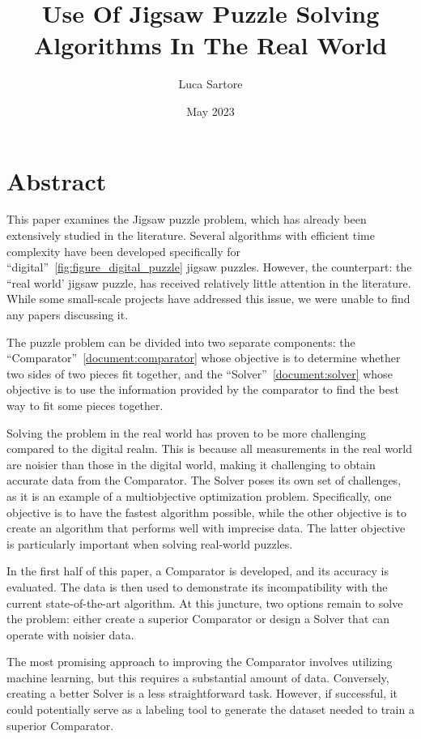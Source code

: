 \documentclass{article}
\title{Use Of Jigsaw Puzzle Solving Algorithms In The Real World}
\author{Luca Sartore}
\date{May 2023}
\begin{document}
\maketitle

\newpage

{
  \hypersetup{linkcolor=black}
  \tableofcontents
}

\newpage

\section{Abstract}
This paper examines the Jigsaw puzzle problem,
which has already been extensively studied in the literature.
Several algorithms with efficient time complexity have been developed
specifically for ``digital''~\ref{fig:figure_digital_puzzle} jigsaw puzzles. However, the counterpart:
the ``real world' jigsaw puzzle, has received relatively little attention
in the literature. While some small-scale projects have addressed this issue,
we were unable to find any papers discussing it.

The puzzle problem can be divided into two separate components: the ``Comparator''~\ref{document:comparator}
whose objective is to determine whether two sides of two pieces fit together,
and the ``Solver''~\ref{document:solver} whose objective is to use the information provided
by the comparator to find the best way to fit some pieces together.

Solving the problem in the real world has proven to be more challenging compared
to the digital realm.
This is because all measurements in the real world are noisier than those
in the digital world, making it challenging to obtain accurate data from the Comparator.
The Solver poses its own set of challenges, as it is an example of a
multiobjective optimization problem. Specifically, one objective is to have
the fastest algorithm possible,
while the other objective is to create an algorithm that performs well with
imprecise data. The latter objective is particularly important when solving
real-world puzzles.

In the first half of this paper, a Comparator is developed, and its accuracy
is evaluated.
The data is then used to demonstrate its incompatibility with the current
state-of-the-art algorithm. At this juncture,
two options remain to solve the problem:
either create a superior Comparator or design a
Solver that can operate with noisier data.

The most promising approach to improving the Comparator
involves utilizing machine learning, but this requires a substantial amount of data.
Conversely, creating a better Solver is a less straightforward task.
However, if successful, it could potentially serve as a labeling tool
to generate the dataset needed to train a superior Comparator.
\end{document}
